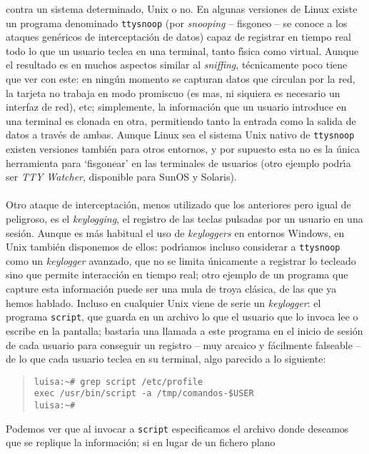 contra un sistema determinado, Unix o no. En algunas versiones de Linux 
existe un programa denominado {\tt ttysnoop} (por {\it snooping} -- fisgoneo -- 
se conoce a los ataques gen\'ericos de interceptaci\'on de datos) capaz de 
registrar en tiempo real todo lo que un usuario teclea en una terminal, tanto
f\'{\i}sica como virtual. Aunque el resultado es en muchos aspectos similar al
{\it sniffing}, t\'ecnicamente poco tiene que ver con este: en ning\'un momento
se capturan datos que circulan por la red, la tarjeta no trabaja en modo 
promiscuo (es mas, ni siquiera es necesario un interfaz de red), etc; 
simplemente, la informaci\'on que un usuario introduce en una terminal es 
clonada en otra, permitiendo tanto la entrada como la salida de datos a trav\'es
de ambas. Aunque Linux sea el sistema Unix nativo de {\tt ttysnoop} existen
versiones tambi\'en para otros entornos, y por supuesto esta no es la \'unica 
herramienta para `fisgonear' en las terminales de usuarios (otro ejemplo 
podr\'{\i}a ser {\it TTY Watcher}, disponible para SunOS y Solaris).\\
\\Otro ataque de interceptaci\'on, menos utilizado que los anteriores pero 
igual de peligroso, es el {\it keylogging}, el registro de las teclas pulsadas
por un usuario en una sesi\'on. Aunque es m\'as habitual el uso de {\it 
keyloggers} en entornos Windows, en Unix tambi\'en disponemos de ellos:
podr\'{\i}amos incluso considerar a {\tt ttysnoop} como un {\it keylogger}
avanzado, que no se limita \'unicamente a registrar lo tecleado sino que 
permite interacci\'on en tiempo real; otro ejemplo de un programa que capture 
esta informaci\'on puede ser una mula de troya cl\'asica, de las que ya hemos 
hablado. Incluso en cualquier Unix viene de serie un {\it keylogger}: el 
programa {\tt script}, que guarda en un archivo lo que el usuario que lo invoca 
lee o escribe en la pantalla; bastar\'{\i}a una llamada a este programa en el 
inicio de sesi\'on de cada usuario para conseguir un registro -- muy arcaico y 
f\'acilmente falseable -- de lo que cada usuario teclea en su terminal, algo 
parecido a lo siguiente:
\begin{quote}
\begin{verbatim}
luisa:~# grep script /etc/profile
exec /usr/bin/script -a /tmp/comandos-$USER
luisa:~#
\end{verbatim}
\end{quote}
Podemos ver que al invocar a {\tt script} especificamos el archivo donde 
deseamos que se replique la informaci\'on; si en lugar de un fichero plano
